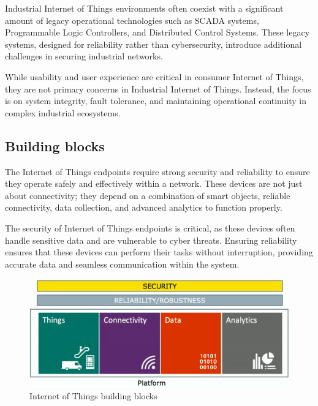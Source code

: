 Industrial Internet of Things environments often coexist with a significant amount of legacy operational technologies such as SCADA systems, Programmable Logic Controllers, and Distributed Control Systems. 
These legacy systems, designed for reliability rather than cybersecurity, introduce additional challenges in securing industrial networks.

While usability and user experience are critical in consumer Internet of Things, they are not primary concerns in Industrial Internet of Things. 
Instead, the focus is on system integrity, fault tolerance, and maintaining operational continuity in complex industrial ecosystems.

\subsection{Building blocks}
The Internet of Things endpoints require strong security and reliability to ensure they operate safely and effectively within a network. 
These devices are not just about connectivity; they depend on a combination of smart objects, reliable connectivity, data collection, and advanced analytics to function properly.

The security of Internet of Things endpoints is critical, as these devices often handle sensitive data and are vulnerable to cyber threats. 
Ensuring reliability ensures that these devices can perform their tasks without interruption, providing accurate data and seamless communication within the system.
\begin{figure}[H]
    \centering
    \includegraphics[width=0.75\linewidth]{images/bb.png}
    \caption{Internet of Things building blocks}
\end{figure}
